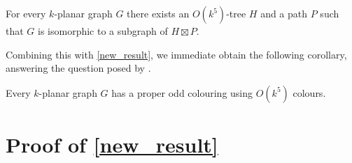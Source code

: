 \documentclass{patmorin}
\begin{document}
\begin{thm}\label{k_planar}
  For every $k$-planar graph $G$ there exists an $O(k^5)$-tree $H$ and a path $P$ such that $G$ is isomorphic to a subgraph of $H\boxtimes P$.
\end{thm}

Combining this with \cref{new_result}, we immediate obtain the following corollary, answering the question posed by \citet{cranston.lafferty.ea:note}.

\begin{cor}
  Every $k$-planar graph $G$ has a proper odd colouring using $O(k^5)$ colours.
\end{cor}

\section{Proof of \cref{new_result}}
\end{document}
